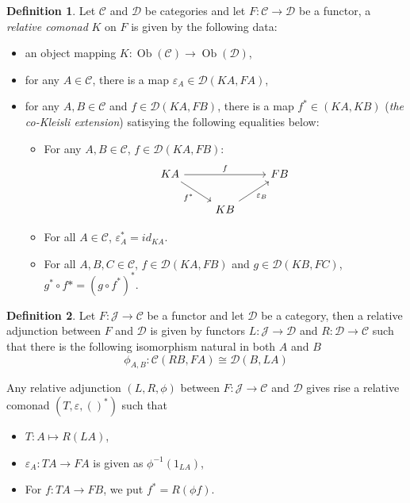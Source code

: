 \documentclass[8pt]{article}
\theoremstyle{definition}
\newtheorem{definition}{Definition}[section]
\theoremstyle{definition}
\theoremstyle{definition}
\theoremstyle{definition}
\theoremstyle{definition}
\theoremstyle{definition}
\theoremstyle{definition}
\theoremstyle{definition}
\theoremstyle{definition}
\theoremstyle{definition}
\theoremstyle{definition}
\theoremstyle{definition}
\theoremstyle{definition}
\theoremstyle{definition}
\theoremstyle{question}
\begin{document}
\begin{definition} Let $\mathcal{C}$ and $\mathcal{D}$ be categories and let $F : \mathcal{C} \to \mathcal{D}$
  be a functor, a \emph{relative comonad} $K$ on $F$ is given by the following data:
  \begin{itemize}
    \item an object mapping $K : \operatorname{Ob}(\mathcal{C}) \to \operatorname{Ob}(\mathcal{D})$,
    \item for any $A \in \mathcal{C}$, there is a map $\varepsilon_A \in \mathcal{D}(KA, FA)$,
    \item for any $A, B \in \mathcal{C}$ and $f \in \mathcal{D}(KA, FB)$, there is a map 
    $f^{*} \in (KA, KB)$ (\emph{the co-Kleisli extension}) satisying the following equalities below:
    \begin{itemize}
      \item For any $A, B \in \mathcal{C}$, $f \in \mathcal{D}(KA, FB)$:
      \[
      \begin{tikzcd}
        KA \ar[rr, "f"] \ar[dr, "f^*"'] && FB \\
        & KB \ar[ur, "\varepsilon_B"']
      \end{tikzcd}
      \]
      \item For all $A \in \mathcal{C}$, $\varepsilon^*_A = id_{K A}$.
      \item For all $A, B, C \in \mathcal{C}$,
      $f \in \mathcal{D}(KA, FB)$ and $g \in \mathcal{D}(KB, FC)$, $g^* \circ f* = (g \circ f^*)^*$.
    \end{itemize}
  \end{itemize}
\end{definition}

\begin{definition}
  Let $F : \mathcal{J} \to \mathcal{C}$ be a functor and let $\mathcal{D}$ be a category,
  then a relative adjunction between $F$ and $\mathcal{D}$ is given by functors
  $L : \mathcal{J} \to \mathcal{D}$ and $R : \mathcal{D} \to \mathcal{C}$ such that
  there is the following isomorphism natural in both $A$ and $B$
  \[
  \phi_{A,B} : \mathcal{C}(RB,FA) \cong \mathcal{D}(B,LA)
  \]
\end{definition}

Any relative adjunction $(L,R,\phi)$ between $F : \mathcal{J} \to \mathcal{C}$ and $\mathcal{D}$ 
gives rise a relative comonad $(T, \varepsilon, ()^*)$ such that
\begin{itemize}
\item $T : A \mapsto R(LA)$,
\item $\varepsilon_A : T A \to F A$ is given as $\phi^{-1}(1_{LA})$,
\item For $f : T A \to F B$, we put $f^* = R(\phi f)$.
\end{itemize}
\end{document}
